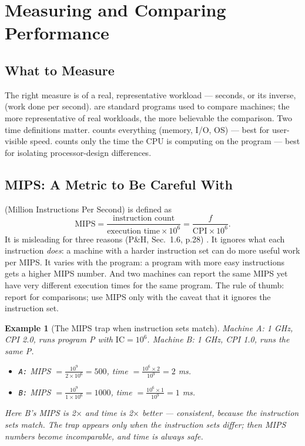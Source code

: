 \documentclass[11pt]{article}
\newtheorem{example}{Example}[section]
\begin{document}
\section{Measuring and Comparing Performance}

\subsection{What to Measure}

The right measure is  of a real, representative workload --- seconds, or its inverse,  (work done per second).  are standard programs used to compare machines; the more representative of real workloads, the more believable the comparison. Two time definitions matter.  counts everything (memory, I/O, OS) --- best for user-visible speed.  counts only the time the CPU is computing on the program --- best for isolating processor-design differences.

\subsection{MIPS: A Metric to Be Careful With}

 (Million Instructions Per Second) is defined as
\[
  \text{MIPS} = \frac{\text{instruction count}}{\text{execution time} \times 10^6}
  = \frac{f}{\text{CPI} \times 10^6}.
\]
It is misleading for three reasons (P\&H, Sec.~1.6, p.28) \cite{PattersonHennessy2017_computer_organization_design}. It ignores what each instruction \emph{does}: a machine with a harder instruction set can do more useful work per MIPS. It varies with the program: a program with more easy instructions gets a higher MIPS number. And two machines can report the same MIPS yet have very different execution times for the same program. The rule of thumb: report  for comparisons; use MIPS only with the caveat that it ignores the instruction set.

\begin{example}[The MIPS trap when instruction sets match]
Machine A: 1 GHz, CPI 2.0, runs program P with $\text{IC}=10^6$. Machine B: 1 GHz, CPI 1.0, runs the same P.
\begin{itemize}
  \item \texttt{A:} MIPS $= \tfrac{10^9}{2\times 10^6} = 500$, time $= \tfrac{10^6 \times 2}{10^9} = 2$ ms.
  \item \texttt{B:} MIPS $= \tfrac{10^9}{1\times 10^6} = 1000$, time $= \tfrac{10^6 \times 1}{10^9} = 1$ ms.
\end{itemize}
Here B's MIPS is 2$\times$ and time is 2$\times$ better --- consistent, because the instruction sets match. The trap appears only when the instruction sets differ; then MIPS numbers become incomparable, and time is always safe.
\end{example}
\end{document}
